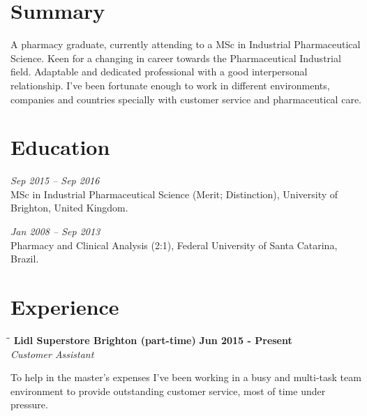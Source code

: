 \documentclass[margin]{res}
\begin{document}
  

\address{Brighton, UK \\ gra.gadotti@gmail.com \\ Phone: +44 07405105756 \\ Post Code: BN21HF }
                           
                        
\begin{resume}                        
 
\section{Summary} A pharmacy graduate, currently attending to a MSc in Industrial Pharmaceutical Science.
Keen for a changing in career towards the Pharmaceutical Industrial field. Adaptable and dedicated
professional with a good interpersonal relationship. I’ve been fortunate enough to work in different
environments, companies and countries specially with customer service and pharmaceutical care.
 
\section{Education}
\textit{Sep 2015 – Sep 2016}\\
MSc in Industrial Pharmaceutical Science (Merit; Distinction), University of Brighton, United Kingdom.

\textit{Jan 2008 – Sep 2013}\\
Pharmacy and Clinical Analysis (2:1), Federal University of Santa Catarina, Brazil.

\section{Experience}

\vspace{-0.1in}
   \begin{tabbing}
   \hspace{2.3in}\= \hspace{1.7in}\= \kill %
    \textbf{Lidl Superstore Brighton (part-time)} \>\>\textbf{Jun 2015 - Present}\\
    \textit{Customer Assistant}\\        
   \end{tabbing}\vspace{-20pt}      %
To help in the master's expenses I’ve been working in a busy and multi-task team environment to provide
outstanding customer service, most of time under pressure.


\end{resume}
\end{document}
